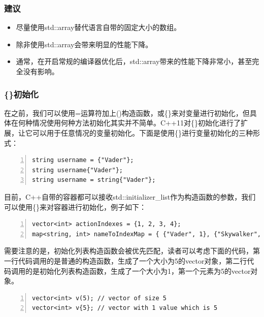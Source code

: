 \documentclass{ctexart}
\begin{document}
\subsubsection*{建议}

\begin{itemize}
	\item 尽量使用std::array替代语言自带的固定大小的数组。
	\item 除非使用std::array会带来明显的性能下降。
	\item 通常，在开启常规的编译器优化后，std::array带来的性能下降非常小，甚至完全没有影响。
\end{itemize}

\subsubsection{\{\}初始化}

在之前，我们可以使用=运算符加上()构造函数，或\{\}来对变量进行初始化，但具体在何种情况使用何种方法初始化其实并不简单。C++11对\{\}初始化进行了扩展，让它可以用于任意情况的变量初始化。下面是使用\{\}进行变量初始化的三种形式：

\begin{lstlisting}[language={[ANSI]C},keywordstyle=\color{blue!70},commentstyle=\color{red!50!green!50!blue!50},frame=shadowbox, rulesepcolor=\color{red!20!green!20!blue!20},basicstyle=\small,numbers=left, numberstyle=\tiny,breaklines=true]
string username = {"Vader"};
string username{"Vader"};
string username = string{"Vader"};
\end{lstlisting}

目前，C++自带的容器都可以接收std::initializer\_list作为构造函数的参数，我们可以使用\{\}来对容器进行初始化，例子如下：

\begin{lstlisting}[language={[ANSI]C},keywordstyle=\color{blue!70},commentstyle=\color{red!50!green!50!blue!50},frame=shadowbox, rulesepcolor=\color{red!20!green!20!blue!20},basicstyle=\small,numbers=left, numberstyle=\tiny,breaklines=true]
vector<int> actionIndexes = {1, 2, 3, 4};
map<string, int> nameToIndexMap = { {"Vader", 1}, {"Skywalker", 1} };
\end{lstlisting}

需要注意的是，初始化列表构造函数会被优先匹配，读者可以考虑下面的代码，第一行代码调用的是普通的构造函数，生成了一个大小为5的vector对象，第二行代码调用的是初始化列表构造函数，生成了一个大小为1，第一个元素为5的vector对象。

\begin{lstlisting}[language={[ANSI]C},keywordstyle=\color{blue!70},commentstyle=\color{red!50!green!50!blue!50},frame=shadowbox, rulesepcolor=\color{red!20!green!20!blue!20},basicstyle=\small,numbers=left, numberstyle=\tiny,breaklines=true]
vector<int> v(5); // vector of size 5  
vector<int> v{5}; // vector with 1 value which is 5
\end{lstlisting}
\end{document}
